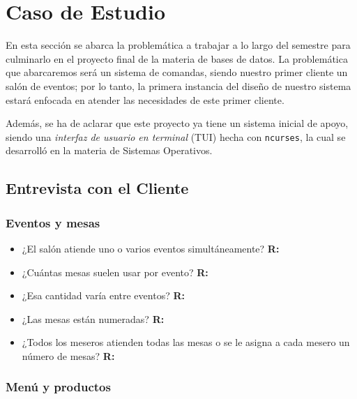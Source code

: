 \newpage

\section{Caso de Estudio}

En esta sección se abarca la problemática a trabajar a lo largo del semestre para culminarlo en el proyecto final de la materia de bases de datos. La problemática que abarcaremos será un sistema de comandas, siendo nuestro primer cliente un salón de eventos; por lo tanto, la primera instancia del diseño de nuestro sistema estará enfocada en atender las necesidades de este primer cliente.

Además, se ha de aclarar que este proyecto ya tiene un sistema inicial de apoyo, siendo una \emph{interfaz de usuario en terminal} (TUI) hecha con \texttt{ncurses}, la cual se desarrolló en la materia de Sistemas Operativos.

\subsection{Entrevista con el Cliente}

\subsubsection{Eventos y mesas}

\begin{itemize}
    \item ¿El salón atiende uno o varios eventos simultáneamente?
    \subitem \textbf{R:}

    \item ¿Cuántas mesas suelen usar por evento?
    \subitem \textbf{R:}

    \item ¿Esa cantidad varía entre eventos?
    \subitem \textbf{R:}

    \item ¿Las mesas están numeradas?
    \subitem \textbf{R:}

    \item ¿Todos los meseros atienden todas las mesas o se le asigna a cada mesero un número de mesas?
    \subitem \textbf{R:}
\end{itemize}

\subsubsection{Menú y productos}

